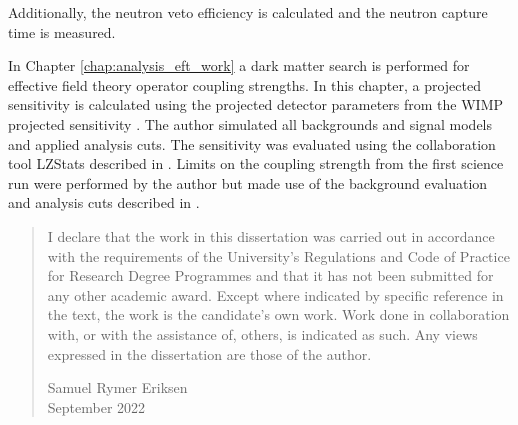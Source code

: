 \begin{SingleSpace}
Additionally, the neutron veto efficiency is calculated and the neutron capture time is measured.
\par
In Chapter \ref{chap:analysis_eft_work} a dark matter search is performed for effective field theory operator coupling strengths.
In this chapter, a projected sensitivity is calculated using the projected detector parameters from the WIMP projected sensitivity \cite{LZ_projected_sensitivity_paper_ref}.
The author simulated all backgrounds and signal models and applied analysis cuts.
The sensitivity was evaluated using the collaboration tool LZStats described in \cite{LZ_Ibles_LZStats_Thesis_ref}.
Limits on the coupling strength from the first science run were performed by the author but made use of the background evaluation and analysis cuts described in \cite{lz_ws_sr1_ref}.

\newpage

\begin{quote}
I declare that the work in this dissertation was carried out in accordance with the requirements of the University's Regulations and Code of Practice for Research Degree Programmes and that it has not been submitted for any other academic award. Except where indicated by specific reference in the text, the work is the candidate's own work. Work done in collaboration with, or with the assistance of, others, is indicated as such. Any views expressed in the dissertation are those of the author.

\begin{flushright}
Samuel Rymer Eriksen \\
September 2022
\end{flushright}

\end{quote}

\end{SingleSpace}
\clearpage